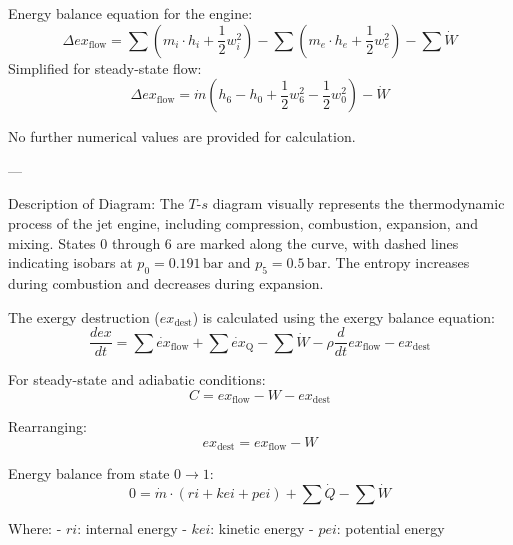 Energy balance equation for the engine:  
\[
\Delta ex_{\text{flow}} = \sum \left( m_i \cdot h_i + \frac{1}{2} w_i^2 \right) - \sum \left( m_e \cdot h_e + \frac{1}{2} w_e^2 \right) - \sum \dot{W}
\]  
Simplified for steady-state flow:  
\[
\Delta ex_{\text{flow}} = \dot{m} \left( h_6 - h_0 + \frac{1}{2} w_6^2 - \frac{1}{2} w_0^2 \right) - \dot{W}
\]  

No further numerical values are provided for calculation.  

---

Description of Diagram:  
The \( T \)-\( s \) diagram visually represents the thermodynamic process of the jet engine, including compression, combustion, expansion, and mixing. States 0 through 6 are marked along the curve, with dashed lines indicating isobars at \( p_0 = 0.191 \, \text{bar} \) and \( p_5 = 0.5 \, \text{bar} \). The entropy increases during combustion and decreases during expansion.

The exergy destruction (\( ex_{\text{dest}} \)) is calculated using the exergy balance equation:  
\[
\frac{d ex}{dt} = \sum \dot{ex}_{\text{flow}} + \sum \dot{ex}_{\text{Q}} - \sum \dot{W} - \rho \frac{d}{dt} ex_{\text{flow}} - ex_{\text{dest}}
\]  

For steady-state and adiabatic conditions:  
\[
C = ex_{\text{flow}} - W - ex_{\text{dest}}
\]  

Rearranging:  
\[
ex_{\text{dest}} = ex_{\text{flow}} - W
\]  

Energy balance from state \( 0 \to 1 \):  
\[
0 = \dot{m} \cdot (ri + kei + pei) + \sum \dot{Q} - \sum \dot{W}
\]  

Where:  
- \( ri \): internal energy  
- \( kei \): kinetic energy  
- \( pei \): potential energy